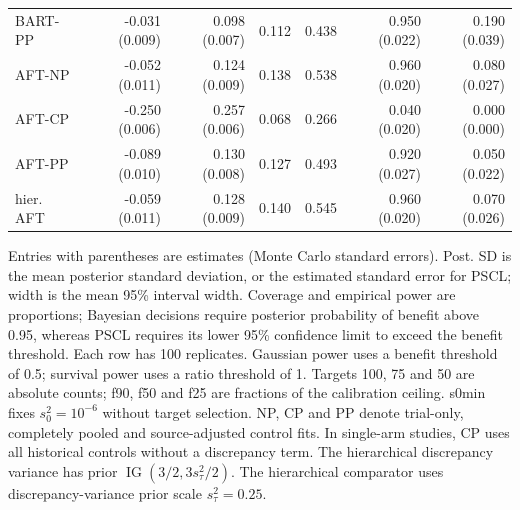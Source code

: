 \begin{landscape}
\begin{longtable}{lrrrrrr}
BART-PP & -0.031 (0.009) & 0.098 (0.007) & 0.112 & 0.438 & 0.950 (0.022) & 0.190 (0.039) \\
AFT-NP & -0.052 (0.011) & 0.124 (0.009) & 0.138 & 0.538 & 0.960 (0.020) & 0.080 (0.027) \\
AFT-CP & -0.250 (0.006) & 0.257 (0.006) & 0.068 & 0.266 & 0.040 (0.020) & 0.000 (0.000) \\
AFT-PP & -0.089 (0.010) & 0.130 (0.008) & 0.127 & 0.493 & 0.920 (0.027) & 0.050 (0.022) \\
hier. AFT & -0.059 (0.011) & 0.128 (0.009) & 0.140 & 0.545 & 0.960 (0.020) & 0.070 (0.026) \\
\end{longtable}
\noindent\begin{minipage}{\linewidth}\footnotesize Entries with parentheses are estimates (Monte Carlo standard errors). Post. SD is the mean posterior standard deviation, or the estimated standard error for PSCL; width is the mean 95\% interval width. Coverage and empirical power are proportions; Bayesian decisions require posterior probability of benefit above 0.95, whereas PSCL requires its lower 95\% confidence limit to exceed the benefit threshold. Each row has 100 replicates. Gaussian power uses a benefit threshold of 0.5; survival power uses a ratio threshold of 1. Targets 100, 75 and 50 are absolute counts; f90, f50 and f25 are fractions of the calibration ceiling. s0min fixes $s_0^2=10^{-6}$ without target selection. NP, CP and PP denote trial-only, completely pooled and source-adjusted control fits. In single-arm studies, CP uses all historical controls without a discrepancy term. The hierarchical discrepancy variance has prior $\operatorname{IG}(3/2,3s_\tau^2/2)$. The hierarchical comparator uses discrepancy-variance prior scale $s_\tau^2=0.25$.\end{minipage}
\endgroup
\end{landscape}
